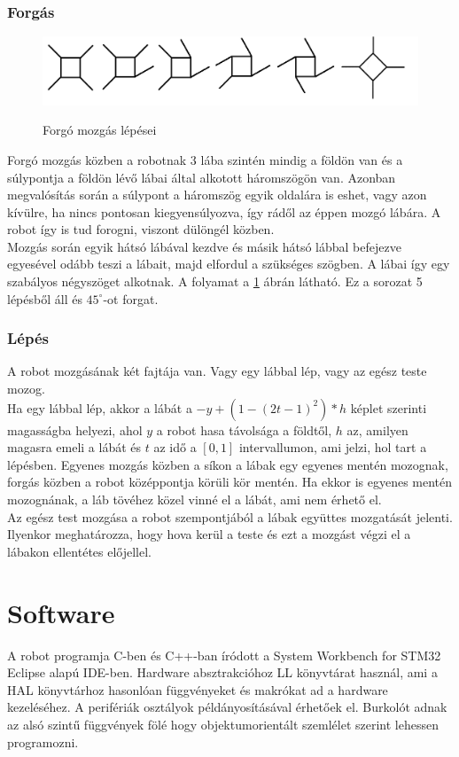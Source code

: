 \documentclass{article}
\begin{document}
\subsubsection{Forgás}
\begin{figure}[h]
	\begin{minipage}{0.9\textwidth}
		\caption{Forgó mozgás lépései}
		\includegraphics[width=\textwidth]{forgas}
		\label{fig:forgas}
	\end{minipage}
\end{figure}
Forgó mozgás közben a robotnak 3 lába szintén mindig a földön van és a súlypontja a földön lévő lábai által alkotott háromszögön van. Azonban megvalósítás során a súlypont a háromszög egyik oldalára is eshet, vagy azon kívülre, ha nincs pontosan kiegyensúlyozva, így rádől az éppen mozgó lábára. A robot így is tud forogni, viszont dülöngél közben.\\
Mozgás során egyik hátsó lábával kezdve és másik hátsó lábbal befejezve egyesével odább teszi a lábait, majd elfordul a szükséges szögben. A lábai így egy szabályos négyszöget alkotnak. A folyamat a \ref{fig:forgas} ábrán látható. Ez a sorozat 5 lépésből áll és $45^\circ$-ot forgat.
\subsubsection{Lépés}
A robot mozgásának két fajtája van. Vagy egy lábbal lép, vagy az egész teste mozog.\\
Ha egy lábbal lép, akkor a lábát a $-y+(1-(2t-1)^2)*h$ képlet szerinti magasságba helyezi, ahol $y$ a robot hasa távolsága a földtől, $h$ az, amilyen magasra emeli a lábát és $t$ az idő a $[0,1]$ intervallumon, ami jelzi, hol tart a lépésben. Egyenes mozgás közben a síkon a lábak egy egyenes mentén mozognak, forgás közben a robot középpontja körüli kör mentén. Ha ekkor is egyenes mentén mozognának, a láb tövéhez közel vinné el a lábát, ami nem érhető el.\\
Az egész test mozgása a robot szempontjából a lábak együttes mozgatását jelenti. Ilyenkor meghatározza, hogy hova kerül a teste és ezt a mozgást végzi el a lábakon ellentétes előjellel.
\section{Software}
A robot programja C-ben és C++-ban íródott a System Workbench for STM32 Eclipse alapú IDE-ben. Hardware absztrakcióhoz LL könyvtárat használ, ami a HAL könyvtárhoz hasonlóan függvényeket és makrókat ad a hardware kezeléséhez. A perifériák osztályok példányosításával érhetőek el. Burkolót adnak az alsó szintű függvények fölé hogy objektumorientált szemlélet szerint lehessen programozni.
\end{document}

